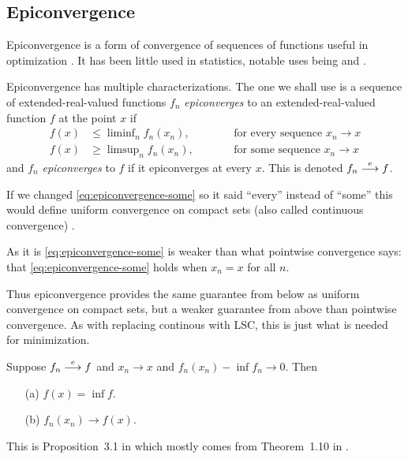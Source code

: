 \subsection{Epiconvergence}

Epiconvergence is a form of convergence of sequences of functions useful
in optimization \citep[Chapter~7]{rockafellar-wets}.  It has been little
used in statistics, notable uses being \citet{geyer-1994-jrssb} and
\citet{constrained-m-estimation}.

Epiconvergence has multiple characterizations.  The one we shall use is
\citet[Proposition~7.2]{rockafellar-wets} a sequence of extended-real-valued
functions $f_n$ \emph{epiconverges} to an extended-real-valued function $f$
at the point $x$ if
\begin{subequations}
\begin{alignat}{2}
   f(x) & \le \liminf\nolimits_n  f_n(x_n), & \qquad &
   \text{for every sequence $x_n \to x$}
   \label{eq:epiconvergence-every}
   \\
   f(x) & \ge \limsup\nolimits_n  f_n(x_n), & \qquad &
   \text{for some sequence $x_n \to x$}
   \label{eq:epiconvergence-some}
\end{alignat}
\end{subequations}
and $f_n$ \emph{epiconverges} to $f$ if it epiconverges at every $x$.
This is denoted $f_n \stackrel{e}{\longrightarrow} f$.

If we changed \eqref{eq:epiconvergence-some} so it said ``every'' instead
of ``some'' this would define uniform convergence on compact sets
(also called continuous convergence) \citep[Section~7.C]{rockafellar-wets}.

As it is \eqref{eq:epiconvergence-some} is weaker than what pointwise
convergence says: that \eqref{eq:epiconvergence-some} holds when $x_n = x$
for all $n$.

Thus epiconvergence provides the same guarantee from below as uniform
convergence on compact sets, but a weaker guarantee from above than
pointwise convergence.  As with replacing continous with LSC, this is
just what is needed for minimization.
\begin{theorem} \label{th:attouch}
Suppose $f_n \stackrel{e}{\longrightarrow} f$ and $x_n \to x$ and $f_n(x_n) - \inf f_n \to 0$.
Then
\begin{itemize}
\item[\normalfont (a)] $f(x) = \inf f$.
\item[\normalfont (b)] $f_n(x_n) \to f(x)$.
\end{itemize}
\end{theorem}
This is Proposition~{3.1} in \citet{constrained-m-estimation} which
mostly comes from Theorem~{1.10} in \citet{attouch}.

